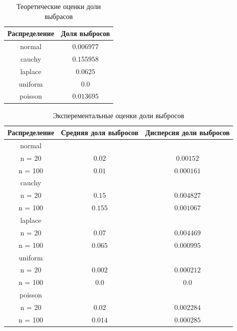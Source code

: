 \documentclass[a4]{article}
\begin{document}
\begin{center}
\begin{table}[H]
    \caption{Теоретические оценки доли выбрасов}
    \label{tab:my_label}
    \begin{center}
    \vspace{5mm}
    \begin{tabular}{|c|c|}
    \hline
    Распределение & Доля выбросов\\
    \hline
         normal	& $0.006977$\\
         \hline
cauchy & $0.155958$\\
\hline
laplace	& $0.0625$\\
\hline
uniform	& $0.0$\\
\hline
poisson	& $0.013695$\\
\hline
    \end{tabular}
    
    \end{center}
    
\end{table}

\begin{table}[H]
	
	\caption{Эксперементальные оценки доли выбросов}
	\label{tab:my_label}
	\begin{center}
		\vspace{5mm}
		\begin{tabular}{|c|c|c|}
			\hline
			Распределение & Средняя доля выбросов & Дисперсия доли выбросов\\
			\hline
			normal	& &\\
			\hline
			n = 20   & 	$0.02$ &  $ 0.00152 $ \\
			\hline
			n = 100   &	$0.01$ & $ 0.000161 $   \\
			\hline
			cauchy	& &\\
			\hline
			n = 20   & 	$0.15$ & $ 0.004827 $   \\
			\hline
			n = 100  & 	$0.155$  & $ 0.001067 $  \\
			\hline
			laplace	& &\\
			\hline
			n = 20    &	$0.07$  & $ 0.004469 $  \\
			\hline
			n = 100   &	$0.065$ & $ 0.000995 $   \\
			\hline
			uniform	& &\\
			\hline
			n = 20    &	$0.002$ & $ 0.000212 $   \\
			\hline
			n = 100   &	$0.0$ & $ 0.0 $  \\ 
			\hline
			poisson	& &\\
			\hline
			n = 20   & 	$0.02$ & $ 0.002284 $   \\
			\hline
			n = 100  & 	$0.014$ & $ 0.000285 $   \\
			\hline
		\end{tabular}
		
	\end{center}
	
\end{table}

\end{center}
\end{document}
